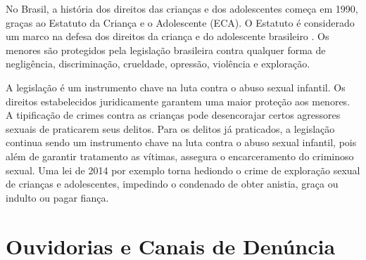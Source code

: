 
No Brasil, a história dos direitos das crianças e dos adolescentes começa em 1990, graças ao Estatuto da Criança e o Adolescente (ECA). O Estatuto é considerado um marco na defesa dos direitos da criança e do adolescente brasileiro \cite{lima2012direitos}. Os menores são protegidos pela legislação brasileira contra qualquer forma de negligência, discriminação, crueldade, opressão, violência e exploração. 


A legislação é um instrumento chave na luta contra o abuso sexual infantil. Os direitos estabelecidos juridicamente garantem uma maior proteção aos menores. A tipificação de crimes contra as crianças pode desencorajar certos agressores sexuais de praticarem seus delitos. Para os delitos já praticados, a legislação continua sendo um instrumento chave na luta contra o abuso sexual infantil, pois além de garantir tratamento as vítimas, assegura o encarceramento do criminoso sexual. Uma lei de 2014 por exemplo %
torna hediondo o crime de exploração sexual de crianças e adolescentes, impedindo o condenado de obter anistia, graça ou indulto ou pagar fiança.


\section{Ouvidorias e Canais de Denúncia}\label{sec:canais}


